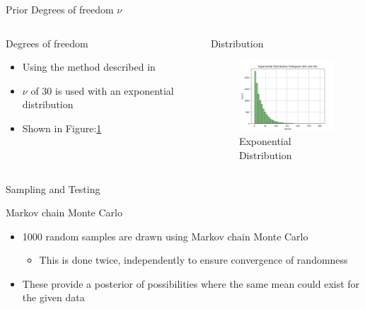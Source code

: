 \documentclass[t, aspectratio=169]{beamer}
\begin{document}
\begin{frame}[label={sec:org6170e12}]{Prior Degrees of freedom \(\nu\)}
\begin{columns}
\begin{column}{0.6\columnwidth}
\begin{block}{Degrees of freedom}
\begin{itemize}
\item Using the method described in \citep{Kruschke2012}
\item \(\nu\) of 30 is used with an exponential distribution
\item Shown in Figure:\ref{fig:org280a4cf}
\end{itemize}
\end{block}
\end{column}


\begin{column}{0.4\columnwidth}
\begin{block}{Distribution}
\begin{figure}[htbp]
\centering
\includegraphics[width=4.5cm]{./images/dist2.png}
\caption{\label{fig:org280a4cf}
Exponential Distribution}
\end{figure}
\end{block}
\end{column}
\end{columns}
\end{frame}



\begin{frame}[label={sec:org7cb6d62}]{Sampling and Testing}
\begin{block}{Markov chain Monte Carlo}
\begin{itemize}
\item 1000 random samples are drawn using Markov chain Monte Carlo
\begin{itemize}
\item This is done twice, independently to ensure convergence of randomness
\end{itemize}
\item These provide a posterior of possibilities where the same mean could exist for the given data
\end{itemize}
\end{block}
\end{frame}
\end{document}
